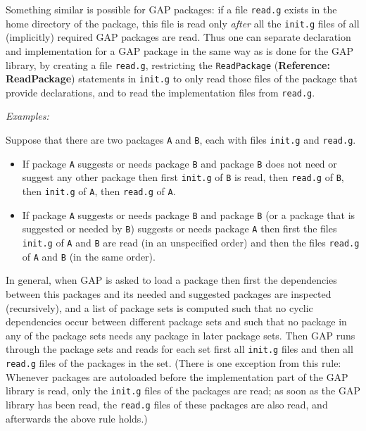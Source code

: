 \documentclass[a4paper,11pt]{report}
\begin{document}
{{ Something similar is possible for \textsf{GAP} packages: if a file \texttt{read.g} exists in the home directory of the package, this file is read only \emph{after} all the \texttt{init.g} files of all (implicitly) required \textsf{GAP} packages are read. Thus one can separate declaration and implementation for a \textsf{GAP} package in the same way as is done for the \textsf{GAP} library, by creating a file \texttt{read.g}, restricting the \texttt{ReadPackage} (\textbf{Reference: ReadPackage}) statements in \texttt{init.g} to only read those files of the package that provide declarations, and to read
the implementation files from \texttt{read.g}. 

 \emph{Examples:} 

 Suppose that there are two packages \texttt{A} and \texttt{B}, each with files \texttt{init.g} and \texttt{read.g}. 

 
\begin{itemize}
\item  If package \texttt{A} suggests or needs package \texttt{B} and package \texttt{B} does not need or suggest any other package then first \texttt{init.g} of \texttt{B} is read, then \texttt{read.g} of \texttt{B}, then \texttt{init.g} of \texttt{A}, then \texttt{read.g} of \texttt{A}. 
\item  If package \texttt{A} suggests or needs package \texttt{B} and package \texttt{B} (or a package that is suggested or needed by \texttt{B}) suggests or needs package \texttt{A} then first the files \texttt{init.g} of \texttt{A} and \texttt{B} are read (in an unspecified order) and then the files \texttt{read.g} of \texttt{A} and \texttt{B} (in the same order). 
\end{itemize}
 

 In general, when \textsf{GAP} is asked to load a package then first the dependencies between this packages
and its needed and suggested packages are inspected (recursively), and a list
of package sets is computed such that no cyclic dependencies occur between
different package sets and such that no package in any of the package sets
needs any package in later package sets. Then \textsf{GAP} runs through the package sets and reads for each set first all \texttt{init.g} files and then all \texttt{read.g} files of the packages in the set. (There is one exception from this rule:
Whenever packages are autoloaded before the implementation part of the \textsf{GAP} library is read, only the \texttt{init.g} files of the packages are read; as soon as the \textsf{GAP} library has been read, the \texttt{read.g} files of these packages are also read, and afterwards the above rule holds.) 

}}
\end{document}
